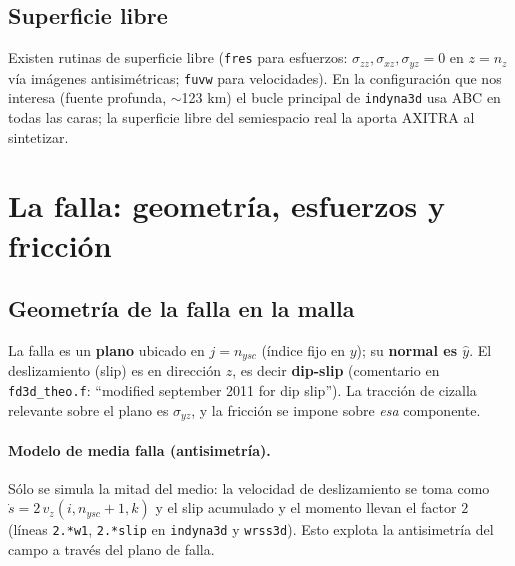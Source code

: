 \documentclass[11pt,a4paper]{article}
\begin{document}
\subsection{Superficie libre}
Existen rutinas de superficie libre (\texttt{fres} para esfuerzos: $\sigma_{zz},
\sigma_{xz},\sigma_{yz}=0$ en $z=n_z$ vía imágenes antisimétricas; \texttt{fuvw}
para velocidades). En la configuración que nos interesa (fuente profunda,
$\sim$123 km) el bucle principal de \texttt{indyna3d} usa ABC en todas las caras;
la superficie libre del semiespacio real la aporta AXITRA al sintetizar.

\section{La falla: geometría, esfuerzos y fricción}

\subsection{Geometría de la falla en la malla}
La falla es un \textbf{plano} ubicado en $j=n_{ysc}$ (índice fijo en $y$); su
\textbf{normal es $\hat y$}. El deslizamiento (slip) es en dirección $z$, es
decir \textbf{dip-slip} (comentario en \texttt{fd3d\_theo.f}: ``modified
september 2011 for dip slip''). La tracción de cizalla relevante sobre el plano
es $\sigma_{yz}$, y la fricción se impone sobre \emph{esa} componente.

\paragraph{Modelo de media falla (antisimetría).} Sólo se simula la mitad del
medio: la velocidad de deslizamiento se toma como
$\dot{s}=2\,v_z(i,n_{ysc}{+}1,k)$ y el slip acumulado y el momento llevan el
factor $2$ (líneas \texttt{2.*w1}, \texttt{2.*slip} en \texttt{indyna3d} y
\texttt{wrss3d}). Esto explota la antisimetría del campo a través del plano de
falla.
\end{document}
